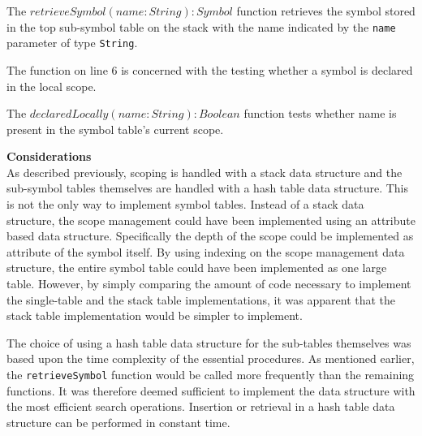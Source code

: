 The $retrieveSymbol(name: String): Symbol$ function retrieves the symbol stored in the top sub-symbol table on the stack with the name indicated by the \texttt{name} parameter of type \texttt{String}.

The function on line 6 is concerned with the testing whether a symbol is declared in the local scope.

The $declaredLocally(name: String): Boolean$ function tests whether name is present in the symbol table's current scope.

\textbf{Considerations}\\
As described previously, scoping is handled with a stack data structure and the sub-symbol tables themselves are handled with a hash table data structure.
This is not the only way to implement symbol tables.
Instead of a stack data structure, the scope management could have been implemented using an attribute based data structure.
Specifically the depth of the scope could be implemented as attribute of the symbol itself.
By using indexing on the scope management data structure, the entire symbol table could have been implemented as one large table.
However, by simply comparing the amount of code necessary to implement the single-table and the stack table implementations, it was apparent that the stack table implementation would be simpler to implement.

The choice of using a hash table data structure for the sub-tables themselves was based upon the time complexity of the essential procedures.
As mentioned earlier, the \texttt{retrieveSymbol} function would be called more frequently than the remaining functions.
It was therefore deemed sufficient to implement the data structure with the most efficient search operations.
Insertion or retrieval in a hash table data structure can be performed in constant time.
